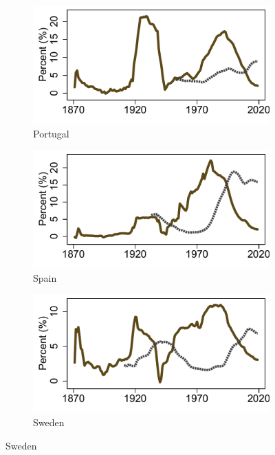 \documentclass[12pt]{article}
\begin{document}
\begin{appendices}
\begin{singlespace}
\begin{figure}[ht]
\begin{subfigure}[b]{0.30\textwidth}
    \end{subfigure} 
    \begin{subfigure}[b]{0.30\textwidth}
    \caption*{Portugal}
    \includegraphics[width=\textwidth]{../Output/Figures/Median_dwn_unemp_Portugal.pdf}   
    \end{subfigure}
    \begin{subfigure}[b]{0.30\textwidth}
    \caption*{Spain}
    \includegraphics[width=\textwidth]{../Output/Figures/Median_dwn_unemp_Spain.pdf}   
    \end{subfigure}
    \begin{subfigure}[b]{0.30\textwidth}
    \caption*{Sweden}
    \includegraphics[width=\textwidth]{../Output/Figures/Median_dwn_unemp_Sweden.pdf}   

\end{subfigure}
\end{figure}
\end{singlespace}
\end{appendices}
\end{document}
